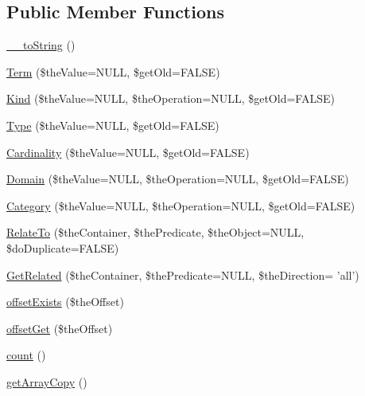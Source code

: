 \subsection*{Public Member Functions}
\begin{DoxyCompactItemize}
\item 
\hyperlink{class_c_ontology_node_ae074c6f51676b4ef5fc3d7fd1c3149af}{\-\_\-\-\_\-to\-String} ()
\item 
\hyperlink{class_c_ontology_node_a2f294a9c93079f58190cedbdd0c09068}{Term} (\$the\-Value=N\-U\-L\-L, \$get\-Old=F\-A\-L\-S\-E)
\item 
\hyperlink{class_c_ontology_node_abfe1cb2e10bb53cf7d500c9860e5cb7a}{Kind} (\$the\-Value=N\-U\-L\-L, \$the\-Operation=N\-U\-L\-L, \$get\-Old=F\-A\-L\-S\-E)
\item 
\hyperlink{class_c_ontology_node_a23d374948e7f950726d60163db05c154}{Type} (\$the\-Value=N\-U\-L\-L, \$get\-Old=F\-A\-L\-S\-E)
\item 
\hyperlink{class_c_ontology_node_af7c5151101b786f49722f7c6576fde70}{Cardinality} (\$the\-Value=N\-U\-L\-L, \$get\-Old=F\-A\-L\-S\-E)
\item 
\hyperlink{class_c_ontology_node_ab96f5c462f470348d014ae0efe43005e}{Domain} (\$the\-Value=N\-U\-L\-L, \$the\-Operation=N\-U\-L\-L, \$get\-Old=F\-A\-L\-S\-E)
\item 
\hyperlink{class_c_ontology_node_a414cd8f920944bed65962492ddb9ce2c}{Category} (\$the\-Value=N\-U\-L\-L, \$the\-Operation=N\-U\-L\-L, \$get\-Old=F\-A\-L\-S\-E)
\item 
\hyperlink{class_c_ontology_node_aa10250322a181c5085058d91da129f37}{Relate\-To} (\$the\-Container, \$the\-Predicate, \$the\-Object=N\-U\-L\-L, \$do\-Duplicate=F\-A\-L\-S\-E)
\item 
\hyperlink{class_c_ontology_node_a73c05b55f31dc210c549faaf7b914761}{Get\-Related} (\$the\-Container, \$the\-Predicate=N\-U\-L\-L, \$the\-Direction= 'all')
\item 
\hyperlink{class_c_ontology_node_af00ed26a322d8f6c97d07a80e8be980d}{offset\-Exists} (\$the\-Offset)
\item 
\hyperlink{class_c_ontology_node_a73a49b503182510cd7451465ee41c6f2}{offset\-Get} (\$the\-Offset)
\item 
\hyperlink{class_c_ontology_node_aa3702123ca5c04ef0f38a011702df49d}{count} ()
\item 
\hyperlink{class_c_ontology_node_a0172babacb8a6d87eef8d6c76a9aa98f}{get\-Array\-Copy} ()
\end{DoxyCompactItemize}

